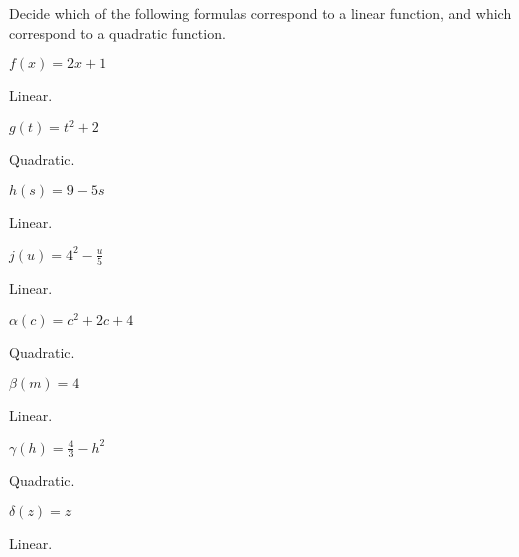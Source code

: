 \begin{exercises}
\begin{problem}
Decide which of the following formulas correspond to a linear function, 
and which correspond to a quadratic function. 
\begin{multicols}{4}
	\begin{subproblem}
		$f(x)=2x+1$ 
		\begin{shortsolution}
			Linear.
		\end{shortsolution}
	\end{subproblem}
	\begin{subproblem}
		$g(t)=t^2+2$ 
		\begin{shortsolution}
			Quadratic.
		\end{shortsolution}
	\end{subproblem}
	\begin{subproblem}
		$h(s)=9-5s$ 
		\begin{shortsolution}
			Linear. 
		\end{shortsolution}
	\end{subproblem}
	\begin{subproblem}
		$j(u)=4^2-\frac{u}{5}$ 
		\begin{shortsolution}
			Linear. 
		\end{shortsolution}
	\end{subproblem}
	\begin{subproblem}
		$\alpha(c)=c^2+2c+4$ 
		\begin{shortsolution}
			Quadratic. 
		\end{shortsolution}
	\end{subproblem}
	\begin{subproblem}
		$\beta(m)=4$ 
		\begin{shortsolution}
			Linear. 
		\end{shortsolution}
	\end{subproblem}
	\begin{subproblem}
		$\gamma(h)=\frac{4}{3}-h^2$ 
		\begin{shortsolution}
			Quadratic. 
		\end{shortsolution}
	\end{subproblem}
	\begin{subproblem}
		$\delta(z)=z$ 
		\begin{shortsolution}
			Linear. 
		\end{shortsolution}
	\end{subproblem}
\end{multicols}

\end{problem}
\end{exercises}

